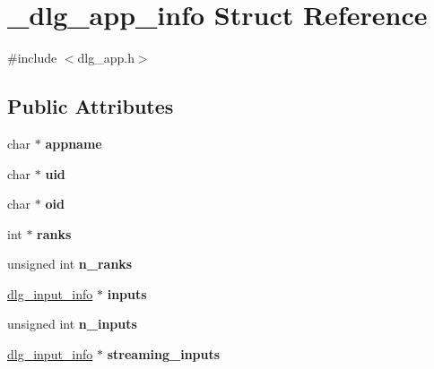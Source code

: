 \hypertarget{struct__dlg__app__info}{}\section{\+\_\+dlg\+\_\+app\+\_\+info Struct Reference}
\label{struct__dlg__app__info}


{\ttfamily \#include $<$dlg\+\_\+app.\+h$>$}

\subsection*{Public Attributes}
\begin{DoxyCompactItemize}
\item 
\mbox{\label{struct__dlg__app__info_a272ad9af1e8bd8b34e57be728e3d7b1d}} 
char $\ast$ {\bfseries appname}
\item 
\mbox{\label{struct__dlg__app__info_abe11a72cae6f79c818b8cb0bb99f2584}} 
char $\ast$ {\bfseries uid}
\item 
\mbox{\label{struct__dlg__app__info_a54b3a693712f4ed12c5d92a1793e005a}} 
char $\ast$ {\bfseries oid}
\item 
\mbox{\label{struct__dlg__app__info_a3c8469bb5bbe6640fbef5b2e5fd1ca4a}} 
int $\ast$ {\bfseries ranks}
\item 
\mbox{\label{struct__dlg__app__info_aa4b7eedc6ba68599ca4e3e9b37e1bdc1}} 
unsigned int {\bfseries n\+\_\+ranks}
\item 
\mbox{\label{struct__dlg__app__info_aacafa51420cd4c6fd8e8b6458276ea37}} 
\mbox{\hyperlink{struct__dlg__input__info}{dlg\+\_\+input\+\_\+info}} $\ast$ {\bfseries inputs}
\item 
\mbox{\label{struct__dlg__app__info_ab3dc6b5fa7c248b24eef62564aed8379}} 
unsigned int {\bfseries n\+\_\+inputs}
\item 
\mbox{\label{struct__dlg__app__info_afc2d14eeafd6a14fb62a61b5a4e7fb96}} 
\mbox{\hyperlink{struct__dlg__input__info}{dlg\+\_\+input\+\_\+info}} $\ast$ {\bfseries streaming\+\_\+inputs}

\end{DoxyCompactItemize}
